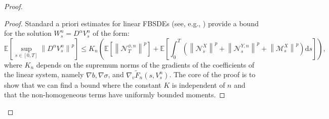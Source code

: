 \documentclass[12pt, letterpaper]{amsart}
\newcommand{\dd}{\mathrm{d}}
\newcommand{\norm}[1]{\left\lVert#1\right\rVert}
\theoremstyle{plain}
\theoremstyle{definition}
\theoremstyle{remark}
\numberwithin{equation}{section} %
\begin{document}
\begin{proof}
\begin{proof}
Standard a priori estimates for linear FBSDEs (see, e.g., \cite[Chapter 4, Theorem 3.2]{MaYong1999}) provide a bound for the solution \(W^n_s = D^\alpha V^n_s\) of the form:
\begin{equation}\label{eq:apriori_estimate_full_proof}
\mathbb{E}\left[\sup_{s \in [0,T]} \norm{D^\alpha V^n_s}^p\right] \le K_n \left( \mathbb{E}\left[\norm{\mathcal{N}^{\phi,n}_T}^p\right] + \mathbb{E}\left[\int_0^T (\norm{\mathcal{N}^X_s}^p + \norm{\mathcal{N}^{Y,n}_s}^p + \norm{\mathcal{M}^X_s}^p) \dd s\right] \right),
\end{equation}
where \(K_n\) depends on the supremum norms of the gradients of the coefficients of the linear system, namely \(\nabla b, \nabla \sigma\), and \(\nabla_v \tilde{F}_n(s, V^n_s)\). The core of the proof is to show that we can find a bound where the constant \(K\) is independent of \(n\) and that the non-homogeneous terms have uniformly bounded moments.


\end{proof}
\end{proof}
\end{document}

